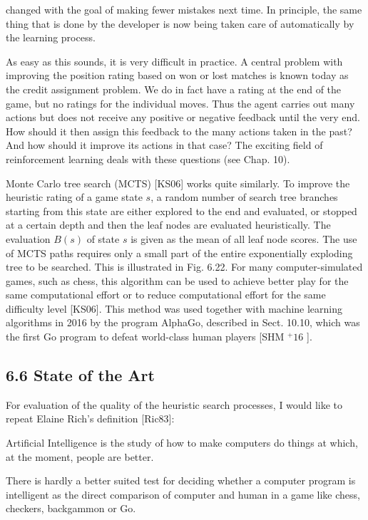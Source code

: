 \documentclass[10pt]{book}
\begin{document}
\begin{center}
\begin{enumerate}
changed with the goal of making fewer mistakes next time. In principle, the same thing that is done by the developer is now being taken care of automatically by the learning process.

As easy as this sounds, it is very difficult in practice. A central problem with improving the position rating based on won or lost matches is known today as the credit assignment problem. We do in fact have a rating at the end of the game, but no ratings for the individual moves. Thus the agent carries out many actions but does not receive any positive or negative feedback until the very end. How should it then assign this feedback to the many actions taken in the past? And how should it improve its actions in that case? The exciting field of reinforcement learning deals with these questions (see Chap. 10).

Monte Carlo tree search (MCTS) [KS06] works quite similarly. To improve the heuristic rating of a game state $s$, a random number of search tree branches starting from this state are either explored to the end and evaluated, or stopped at a certain depth and then the leaf nodes are evaluated heuristically. The evaluation $B(s)$ of state $s$ is given as the mean of all leaf node scores. The use of MCTS paths requires only a small part of the entire exponentially exploding tree to be searched. This is illustrated in Fig. 6.22. For many computer-simulated games, such as chess, this algorithm can be used to achieve better play for the same computational effort or to reduce computational effort for the same difficulty level [KS06]. This method was used together with machine learning algorithms in 2016 by the program AlphaGo, described in Sect. 10.10, which was the first Go program to defeat world-class human players [SHM ${ }^{+} 16$ ].

\subsection*{6.6 State of the Art}
For evaluation of the quality of the heuristic search processes, I would like to repeat Elaine Rich's definition [Ric83]:

Artificial Intelligence is the study of how to make computers do things at which, at the moment, people are better.

There is hardly a better suited test for deciding whether a computer program is intelligent as the direct comparison of computer and human in a game like chess, checkers, backgammon or Go.


\end{enumerate}
\end{center}
\end{document}
